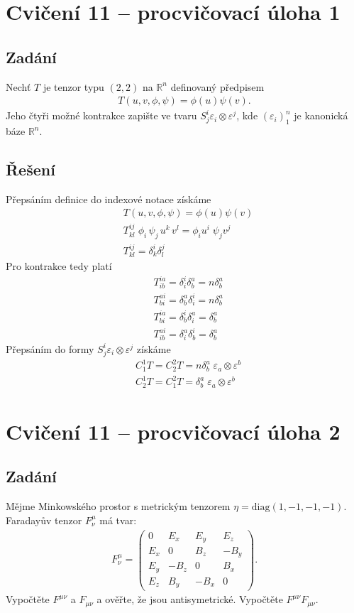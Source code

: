 \documentclass[]{article}
\newcommand{\mat}[1]{\begin{pmatrix}#1\end{pmatrix}}
\begin{document}
\section{Cvičení 11 – procvičovací úloha 1}

\subsection{Zadání}
Nechť $T$ je tenzor typu $(2,2)$ na $\mathbb{R}^n$ definovaný předpisem
\begin{align*}
    T(u,v,\phi,\psi) = \phi(u) \psi(v).
\end{align*}
Jeho čtyři možné kontrakce zapište ve tvaru $S^i_j \varepsilon_i \otimes \varepsilon^j$, kde $(\varepsilon_i)_1^n$ je kanonická báze $\mathbb{R}^n$.

\subsection{Řešení}
Přepsáním definice do indexové notace získáme
\begin{align*}
    &T(u,v,\phi,\psi) = \phi(u) \psi(v) \\
    &T^{ij}_{kl} \; \phi_i \, \psi_j \, u^k \, v^l = \phi_i u^i \; \psi_j v^j \\
    &T^{ij}_{kl} = \delta^i_k \delta^j_l
\end{align*}
Pro kontrakce tedy platí
\begin{align*}
    &T^{ia}_{ib} = \delta^i_i \delta^a_b = n\delta^a_b \\
    &T^{ai}_{bi} = \delta^a_b \delta^i_i = n\delta^a_b \\
    &T^{ia}_{bi} = \delta^i_b \delta^a_i = \delta^a_b \\
    &T^{ai}_{ib} = \delta^a_i \delta^i_b = \delta^a_b
\end{align*}
Přepsáním do formy $S^i_j \varepsilon_i \otimes \varepsilon^j$ získáme
\begin{align*}
    &C^1_1 T = C^2_2 T = n\delta^a_b \; \varepsilon_a \otimes \varepsilon^b \\
    &C^1_2 T = C^2_1 T = \delta^a_b \; \varepsilon_a \otimes \varepsilon^b
\end{align*}



\section{Cvičení 11 – procvičovací úloha 2}
\subsection{Zadání}
Mějme Minkowského prostor s metrickým tenzorem $\eta = \mathrm{diag}(1,-1,-1,-1)$. Faradayův tenzor $F^\mu_\nu$ má tvar:
\begin{align*}
    F^\mu_\nu = \mat{
        0 & E_x & E_y & E_z \\
        E_x & 0 & B_z & -B_y \\
        E_y & -B_z & 0 & B_x \\
        E_z & B_y & -B_x & 0
    }.
\end{align*}
Vypočtěte $F^{\mu\nu}$ a $F_{\mu\nu}$ a ověřte, že jsou antisymetrické. Vypočtěte $F^{\mu\nu} F_{\mu\nu}$.
\end{document}
